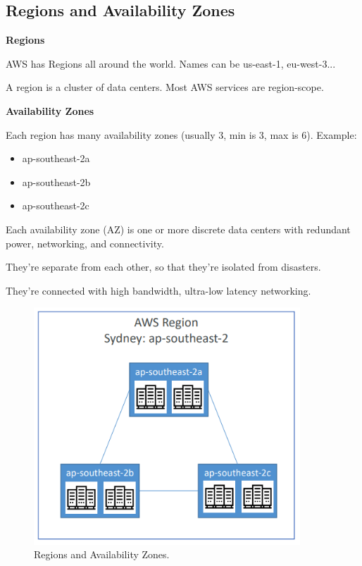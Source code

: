 \documentclass{article}
\begin{document}
\subsection{Regions and Availability Zones}
\textbf{Regions}\par
\vspace{10pt}
AWS has Regions all around the world. Names can be us-east-1, eu-west-3...\par
A region is a cluster of data centers. Most AWS services are region-scope.\par
\newpage
\textbf{Availability Zones}\par
\vspace{10pt}
Each region has many availability zones (usually 3, min is 3, max is 6). Example:\par
\begin{itemize}
    \item ap-southeast-2a
    \item ap-southeast-2b
    \item ap-southeast-2c
\end{itemize}
  \par
Each availability zone (AZ) is one or more discrete data centers with redundant power, networking, and connectivity.\par
They’re separate from each other, so that they’re isolated from disasters.\par
They’re connected with high bandwidth, ultra-low latency networking.\par
\begin{figure}[h]
    \centering
    \includegraphics[width = 10cm]{Pictures/Theory/Regions and AZs.png}
    \caption{Regions and Availability Zones.}
    \label{fig:enter-label}
\end{figure}
\end{document}
